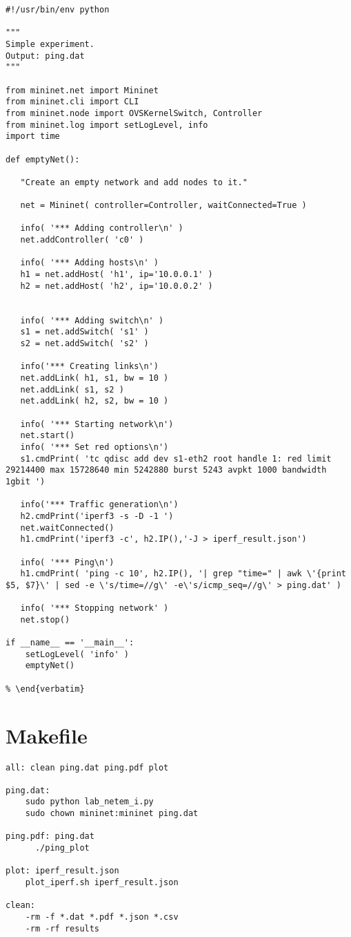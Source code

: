 \begin{verbatim}
#!/usr/bin/env python

"""
Simple experiment.
Output: ping.dat
"""

from mininet.net import Mininet
from mininet.cli import CLI
from mininet.node import OVSKernelSwitch, Controller
from mininet.log import setLogLevel, info
import time

def emptyNet():

   "Create an empty network and add nodes to it."

   net = Mininet( controller=Controller, waitConnected=True )

   info( '*** Adding controller\n' )
   net.addController( 'c0' )

   info( '*** Adding hosts\n' )
   h1 = net.addHost( 'h1', ip='10.0.0.1' )
   h2 = net.addHost( 'h2', ip='10.0.0.2' )


   info( '*** Adding switch\n' )
   s1 = net.addSwitch( 's1' )
   s2 = net.addSwitch( 's2' )

   info('*** Creating links\n')
   net.addLink( h1, s1, bw = 10 )
   net.addLink( s1, s2 )
   net.addLink( h2, s2, bw = 10 )

   info( '*** Starting network\n')
   net.start()
   info( '*** Set red options\n')
   s1.cmdPrint( 'tc qdisc add dev s1-eth2 root handle 1: red limit 29214400 max 15728640 min 5242880 burst 5243 avpkt 1000 bandwidth 1gbit ')

   info('*** Traffic generation\n')
   h2.cmdPrint('iperf3 -s -D -1 ')
   net.waitConnected()
   h1.cmdPrint('iperf3 -c', h2.IP(),'-J > iperf_result.json') 
 
   info( '*** Ping\n')
   h1.cmdPrint( 'ping -c 10', h2.IP(), '| grep "time=" | awk \'{print $5, $7}\' | sed -e \'s/time=//g\' -e\'s/icmp_seq=//g\' > ping.dat' )

   info( '*** Stopping network' )
   net.stop()

if __name__ == '__main__':
    setLogLevel( 'info' )
    emptyNet()
    
% \end{verbatim}
\end{verbatim}


\section*{Makefile}

\begin{verbatim}
all: clean ping.dat ping.pdf plot

ping.dat:
	sudo python lab_netem_i.py
	sudo chown mininet:mininet ping.dat

ping.pdf: ping.dat
	  ./ping_plot

plot: iperf_result.json
	plot_iperf.sh iperf_result.json

clean:
	-rm -f *.dat *.pdf *.json *.csv
	-rm -rf results
\end{verbatim}

